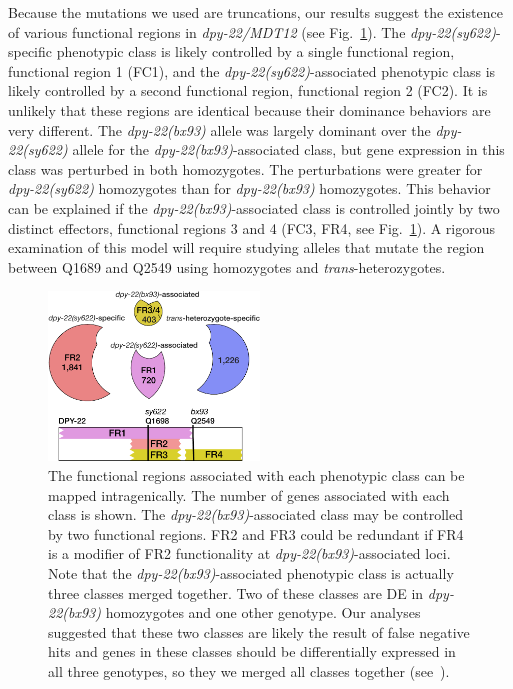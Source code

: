 \documentclass[8pt, twocolumn]{article}
\newcommand{\gene}[1]{\mbox{\emph{#1}}}
\newcommand{\dpy}[1]{\gene{dpy-22#1}}
\newcommand{\bx}{\dpy{(bx93)}}
\newcommand{\sy}{\dpy{(sy622)}}
\begin{document}
Because the mutations we used are truncations, our results suggest the existence
of various functional regions in \dpy{/MDT12} (see Fig.~\ref{fig:domains}). The
\sy{}-specific phenotypic class is likely controlled by a single functional
region, functional region 1 (FC1), and the \sy{}-associated phenotypic class is
likely controlled by a second functional region, functional region 2 (FC2). It
is unlikely that these regions are identical because their dominance behaviors
are very different. The \bx{} allele was largely dominant over the \sy{} allele
for the \bx{}-associated class, but gene expression in this class was perturbed
in both homozygotes. The perturbations were greater for \sy{} homozygotes than
for \bx{} homozygotes. This behavior can be explained if the \bx{}-associated
class is controlled jointly by two distinct effectors, functional regions 3 and
4 (FC3, FR4, see Fig.~\ref{fig:domains}). A rigorous examination of this model
will require studying alleles that mutate the region between Q1689 and Q2549
using homozygotes and \emph{trans}-heterozygotes.


\begin{figure}
  \centering{}
  \includegraphics[width=0.5\textwidth]{../../figs/inferred_domains.pdf}
  \caption{
    The functional regions associated with each phenotypic class can be mapped
    intragenically. The number of genes associated with each class is shown. The
    \bx{}-associated class may be controlled by two functional regions. FR2 and
    FR3 could be redundant if FR4 is a modifier of FR2 functionality at
    \bx{}-associated loci. Note that the \bx{}-associated phenotypic class is
    actually three classes merged together. Two of these classes are DE in \bx{}
    homozygotes and one other genotype. Our analyses suggested that these two
    classes are likely the result of false negative hits and genes in these
    classes should be differentially expressed in all three genotypes, so they
    we merged all classes together (see~).
  }
\label{fig:domains}
\end{figure}
\end{document}
